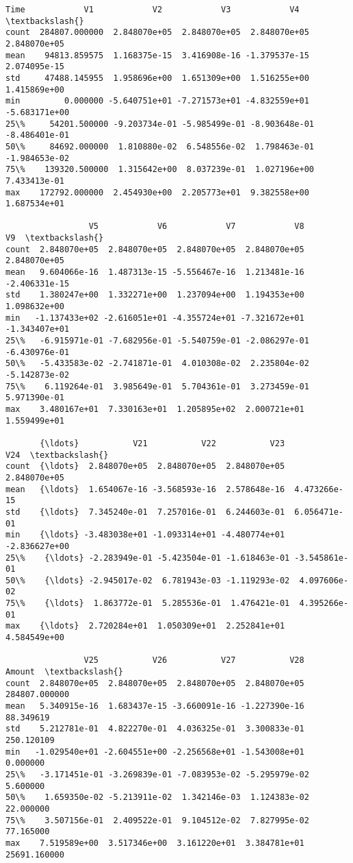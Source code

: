 \documentclass[11pt]{article}
\makeatletter
\newcommand{\boxspacing}{\kern\kvtcb@left@rule\kern\kvtcb@boxsep}
\newcommand{\prompt}[4]{
        {\ttfamily\llap{{\color{#2}[#3]:\hspace{3pt}#4}}\vspace{-\baselineskip}}
    }
\makeatother
\begin{document}
            \begin{tcolorbox}[breakable, size=fbox, boxrule=.5pt, pad at break*=1mm, opacityfill=0]
\prompt{Out}{outcolor}{8}{\boxspacing}
\begin{Verbatim}[commandchars=\\\{\}]
                Time            V1            V2            V3            V4  \textbackslash{}
count  284807.000000  2.848070e+05  2.848070e+05  2.848070e+05  2.848070e+05
mean    94813.859575  1.168375e-15  3.416908e-16 -1.379537e-15  2.074095e-15
std     47488.145955  1.958696e+00  1.651309e+00  1.516255e+00  1.415869e+00
min         0.000000 -5.640751e+01 -7.271573e+01 -4.832559e+01 -5.683171e+00
25\%     54201.500000 -9.203734e-01 -5.985499e-01 -8.903648e-01 -8.486401e-01
50\%     84692.000000  1.810880e-02  6.548556e-02  1.798463e-01 -1.984653e-02
75\%    139320.500000  1.315642e+00  8.037239e-01  1.027196e+00  7.433413e-01
max    172792.000000  2.454930e+00  2.205773e+01  9.382558e+00  1.687534e+01

                 V5            V6            V7            V8            V9  \textbackslash{}
count  2.848070e+05  2.848070e+05  2.848070e+05  2.848070e+05  2.848070e+05
mean   9.604066e-16  1.487313e-15 -5.556467e-16  1.213481e-16 -2.406331e-15
std    1.380247e+00  1.332271e+00  1.237094e+00  1.194353e+00  1.098632e+00
min   -1.137433e+02 -2.616051e+01 -4.355724e+01 -7.321672e+01 -1.343407e+01
25\%   -6.915971e-01 -7.682956e-01 -5.540759e-01 -2.086297e-01 -6.430976e-01
50\%   -5.433583e-02 -2.741871e-01  4.010308e-02  2.235804e-02 -5.142873e-02
75\%    6.119264e-01  3.985649e-01  5.704361e-01  3.273459e-01  5.971390e-01
max    3.480167e+01  7.330163e+01  1.205895e+02  2.000721e+01  1.559499e+01

       {\ldots}           V21           V22           V23           V24  \textbackslash{}
count  {\ldots}  2.848070e+05  2.848070e+05  2.848070e+05  2.848070e+05
mean   {\ldots}  1.654067e-16 -3.568593e-16  2.578648e-16  4.473266e-15
std    {\ldots}  7.345240e-01  7.257016e-01  6.244603e-01  6.056471e-01
min    {\ldots} -3.483038e+01 -1.093314e+01 -4.480774e+01 -2.836627e+00
25\%    {\ldots} -2.283949e-01 -5.423504e-01 -1.618463e-01 -3.545861e-01
50\%    {\ldots} -2.945017e-02  6.781943e-03 -1.119293e-02  4.097606e-02
75\%    {\ldots}  1.863772e-01  5.285536e-01  1.476421e-01  4.395266e-01
max    {\ldots}  2.720284e+01  1.050309e+01  2.252841e+01  4.584549e+00

                V25           V26           V27           V28         Amount  \textbackslash{}
count  2.848070e+05  2.848070e+05  2.848070e+05  2.848070e+05  284807.000000
mean   5.340915e-16  1.683437e-15 -3.660091e-16 -1.227390e-16      88.349619
std    5.212781e-01  4.822270e-01  4.036325e-01  3.300833e-01     250.120109
min   -1.029540e+01 -2.604551e+00 -2.256568e+01 -1.543008e+01       0.000000
25\%   -3.171451e-01 -3.269839e-01 -7.083953e-02 -5.295979e-02       5.600000
50\%    1.659350e-02 -5.213911e-02  1.342146e-03  1.124383e-02      22.000000
75\%    3.507156e-01  2.409522e-01  9.104512e-02  7.827995e-02      77.165000
max    7.519589e+00  3.517346e+00  3.161220e+01  3.384781e+01   25691.160000


\end{Verbatim}
\end{tcolorbox}
\end{document}
